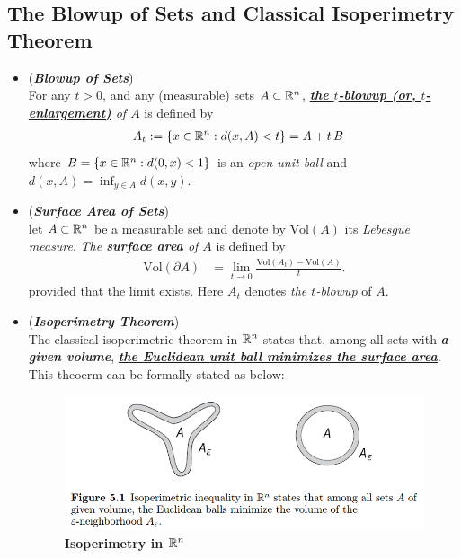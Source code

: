 \documentclass[11pt]{article}
\begin{document}
\subsection{The Blowup of Sets and Classical Isoperimetry Theorem}
\begin{itemize}
\item \begin{definition} (\textbf{\emph{Blowup of Sets}}) \\
For any $t > 0$, and any (measurable) sets $A \subset {\mathbb R}^n$,  \emph{\underline{\textbf{the $t$-blowup (or, $t$-enlargement)}} of $A$} is defined by
\begin{align*}
A_t &:= \left\{x \in {\mathbb R}^n: d(x, A) < t\right\} = A + t\,B
\end{align*} where $B = \left\{x \in {\mathbb R}^n: d(0, x) < 1\right\}$ is an \emph{open unit ball} and $d(x, A) = \inf_{y \in A}d(x, y)$.
\end{definition}

\item \begin{definition}(\textbf{\emph{Surface Area of Sets}}) \\
let $A \subset {\mathbb R}^n$ be a measurable set and denote by $\text{Vol}(A)$ its \emph{Lebesgue measure}. \emph{The  \underline{\textbf{surface area}} of $A$} is
defined by
\begin{align*}
\text{Vol}(\partial A) &= \lim\limits_{t \to 0}\frac{\text{Vol}(A_t) - \text{Vol}(A)}{t}.
\end{align*} provided that the limit exists. Here $A_t$ denotes \emph{the $t$-blowup} of $A$.
\end{definition}

\item \begin{remark}(\textbf{\emph{Isoperimetry Theorem}})\\
The classical isoperimetric theorem in ${\mathbb R}^n$ states that, among all sets with \emph{\textbf{a given volume}}, \underline{\emph{\textbf{the Euclidean unit ball minimizes the surface area}}}.  This theoerm can be formally stated as below:
\end{remark}

\begin{figure}
\begin{minipage}[t]{1\linewidth}
  \centering
  \centerline{\includegraphics[scale = 0.4]{isoperimetry_rn.png}}
\end{minipage}
\caption{\footnotesize{\textbf{Isoperimetry in ${\mathbb R}^{n}$  \citep{vershynin2018high}}}}
\label{fig: isoperimetry_rn}
\end{figure}



\end{itemize}
\end{document}
